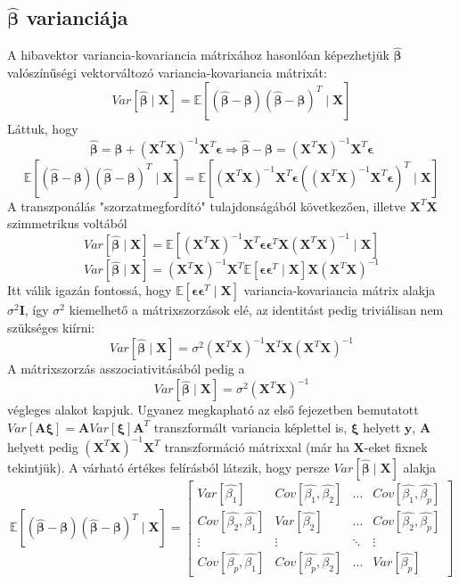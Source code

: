 \documentclass[14p]{report}
\def\pmb{\boldsymbol}
\def\ebeta{\hat{\pmb{\beta}}}
\def\e{\epsilon}
\begin{document}
	\subsection{$\ebeta$ varianciája}
	A hibavektor variancia-kovariancia mátrixához hasonlóan képezhetjük $\ebeta$ valószínűségi vektorváltozó variancia-kovariancia mátrixát:
	\[
	Var[\ebeta \mid \pmb{X}] = \mathbb{E}[(\ebeta - \pmb{\beta})(\ebeta - \pmb{\beta})^T \mid \pmb{X}]
	\]
	Láttuk, hogy
	\[
	\ebeta = \pmb{\beta} + (\pmb{X}^T\pmb{X})^{-1}\pmb{X}^T\pmb{\e} \Longrightarrow \ebeta - \pmb{\beta} = (\pmb{X}^T\pmb{X})^{-1}\pmb{X}^T\pmb{\e}
	\]
	\[
	\mathbb{E}[(\ebeta - \pmb{\beta})(\ebeta - \pmb{\beta})^T \mid \pmb{X}] = 
	\mathbb{E}\left[
	(\pmb{X}^T\pmb{X})^{-1}\pmb{X}^T\pmb{\e}((\pmb{X}^T\pmb{X})^{-1}\pmb{X}^T\pmb{\e})^T \mid \pmb{X}
	\right]
	\]
	A transzponálás "szorzatmegfordító" tulajdonságából következően, illetve $\pmb{X}^T\pmb{X}$ szimmetrikus voltából
	\[
	Var[\ebeta \mid \pmb{X}] = 
	\mathbb{E}\left[
	(\pmb{X}^T\pmb{X})^{-1}\pmb{X}^T\pmb{\e}\pmb{\e}^T\pmb{X}(\pmb{X}^T\pmb{X})^{-1} \mid \pmb{X}
	\right]
	\]
	\[
	Var[\ebeta \mid \pmb{X}] = (\pmb{X}^T\pmb{X})^{-1}\pmb{X}^T\mathbb{E}[\pmb{\e}\pmb{\e}^T \mid \pmb{X}]\pmb{X}(\pmb{X}^T\pmb{X})^{-1}
	\]
	Itt válik igazán fontossá, hogy $\mathbb{E}[\pmb{\e}\pmb{\e}^T \mid \pmb{X}]$ variancia-kovariancia mátrix alakja $\sigma^2\pmb{I}$, így $\sigma^2$ kiemelhető a mátrixszorzások elé, az identitást pedig triviálisan nem szükséges kiírni:
	\[
	Var[\ebeta \mid \pmb{X}] = \sigma^2(\pmb{X}^T\pmb{X})^{-1}\pmb{X}^T\pmb{X}(\pmb{X}^T\pmb{X})^{-1}
	\]
	A mátrixszorzás asszociativitásából pedig a
	\[
	Var[\ebeta \mid \pmb{X}] = \sigma^2(\pmb{X}^T\pmb{X})^{-1}
	\]
	végleges alakot kapjuk. Ugyanez megkapható az első fejezetben bemutatott $Var[\pmb{A}\pmb{\xi}] = \pmb{A}Var[\pmb{\xi}]\pmb{A}^T$ transzformált variancia képlettel is, $\pmb{\xi}$ helyett $\pmb{y}$, $\pmb{A}$ helyett pedig $(\pmb{X}^T\pmb{X})^{-1}\pmb{X}^T$ transzformáció mátrixxal (már ha $\pmb{X}$-eket fixnek tekintjük). A várható értékes felírásból látszik, hogy persze $Var[\ebeta \mid \pmb{X}]$ alakja
	\[
	\mathbb{E}[(\ebeta - \pmb{\beta})(\ebeta - \pmb{\beta})^T \mid \pmb{X}] =
	\begin{bmatrix}
		Var[\hat{\beta_1}] & Cov[\hat{\beta_1},\hat{\beta_2}] & \dots & Cov[\hat{\beta_1},\hat{\beta_p}] \\
		Cov[\hat{\beta_2},\hat{\beta_1}] & Var[\hat{\beta_2}] & \dots & Cov[\hat{\beta_2},\hat{\beta_p}] \\
		\vdots & \vdots & \ddots & \vdots \\
		Cov[\hat{\beta_p},\hat{\beta_1}] & Cov[\hat{\beta_p},\hat{\beta_2}] & \dots & Var[\hat{\beta_p}]
	\end{bmatrix}
	\]
\end{document}
